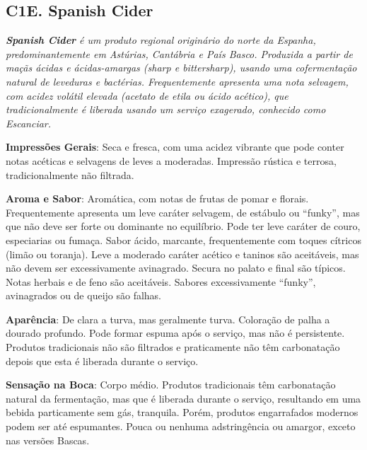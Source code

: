 \subsection*{C1E. Spanish Cider}

\textit{\textbf{Spanish Cider} é um produto regional originário do norte da Espanha, predominantemente em Astúrias, Cantábria e País Basco. Produzida a partir de maçãs ácidas e ácidas-amargas (\textit{sharp} e \textit{bittersharp}), usando uma cofermentação natural de leveduras e bactérias. Frequentemente apresenta uma nota selvagem, com acidez volátil elevada (acetato de etila ou ácido acético), que tradicionalmente é liberada usando um serviço exagerado, conhecido como \textit{Escanciar}.}

\textbf{Impressões Gerais}: Seca e fresca, com uma acidez vibrante que pode conter notas acéticas e selvagens de leves a moderadas. Impressão rústica e terrosa, tradicionalmente não filtrada.

\textbf{Aroma e Sabor}: Aromática, com notas de frutas de pomar e florais. Frequentemente apresenta um leve caráter selvagem, de estábulo ou “funky”, mas que não deve ser forte ou dominante no equilíbrio. Pode ter leve caráter de couro, especiarias ou fumaça. Sabor ácido, marcante, frequentemente com toques cítricos (limão ou toranja). Leve a moderado caráter acético e taninos são aceitáveis, mas não devem ser excessivamente avinagrado. Secura no palato e final são típicos. Notas herbais e de feno são aceitáveis. Sabores excessivamente “funky”, avinagrados ou de queijo são falhas.

\textbf{Aparência}: De clara a turva, mas geralmente turva. Coloração de palha a dourado profundo. Pode formar espuma após o serviço, mas não é persistente. Produtos tradicionais não são filtrados e praticamente não têm carbonatação depois que esta é liberada durante o serviço.

\textbf{Sensação na Boca}: Corpo médio. Produtos tradicionais têm carbonatação natural da fermentação, mas que é liberada durante o serviço, resultando em uma bebida particamente sem gás, tranquila. Porém, produtos engarrafados modernos podem ser até espumantes. Pouca ou nenhuma adstringência ou amargor, exceto nas versões Bascas.


